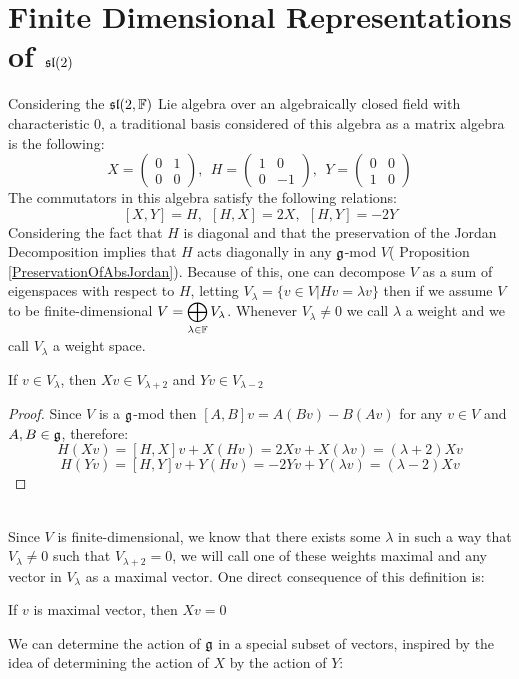 \section{Finite Dimensional Representations of $\mathfrak{sl}(2)$}
Considering the $\mathfrak{sl}(2,\mathbb{F})$ Lie algebra over an algebraically closed field with characteristic $0$, a traditional basis considered of this algebra as a matrix algebra is the following:
$$X = \begin{pmatrix}
0 & 1 \\
0 & 0 
\end{pmatrix}, \ \ H = \begin{pmatrix}
1 & 0 \\
0 & -1 
\end{pmatrix}, \ \ Y = \begin{pmatrix}
0 & 0 \\
1 & 0 
\end{pmatrix}$$
The commutators in this algebra satisfy the following relations:
$$[X,Y]=H, \ \ [H,X]=2X, \ \ [H,Y]=-2Y$$
Considering the fact that $H$ is diagonal and that the preservation of the Jordan Decomposition implies that $H$ acts diagonally in any $\mathfrak{g}$-mod $V$( Proposition \ref{PreservationOfAbsJordan}). Because of this, one can decompose $V$ as a sum of eigenspaces with respect to $H$, letting $V_\lambda = \{v \in V|Hv=\lambda v\}$ then if we assume $V$ to be finite-dimensional $V=\displaystyle\bigoplus_{\lambda \in \mathbb{F}} V_\lambda$. Whenever $V_\lambda \not=0$ we call $\lambda$ a weight and we call $V_\lambda$ a weight space.\\
\begin{lema}
	If $v \in V_\lambda$, then $Xv \in V_{\lambda+2}$ and $Yv \in V_{\lambda-2}$
\end{lema}
\begin{proof}
	Since $V$ is a $\mathfrak{g}$-mod then $[A,B]v = A(Bv)-B(Av)$ for any $v \in V$ and $A,B \in \mathfrak{g}$, therefore:
	$$H(Xv)=[H,X]v + X(Hv) = 2Xv + X(\lambda v) = (\lambda + 2)Xv$$
	$$H(Yv)=[H,Y]v + Y(Hv) = -2Yv + Y(\lambda v) = (\lambda - 2)Xv$$
\end{proof}\\
Since $V$ is finite-dimensional, we know that there exists some $\lambda$ in such a way that $V_\lambda\not=0$ such that $V_{\lambda+2}=0$, we will call one of these weights maximal and any vector in $V_\lambda$ as a maximal vector. One direct consequence of this definition is:
\begin{prop}
If $v$ is maximal vector, then $Xv=0$
\end{prop}
We can determine the action of $\mathfrak{g}$ in a special subset of vectors, inspired by the idea of determining the action of $X$ by the action of $Y$:
